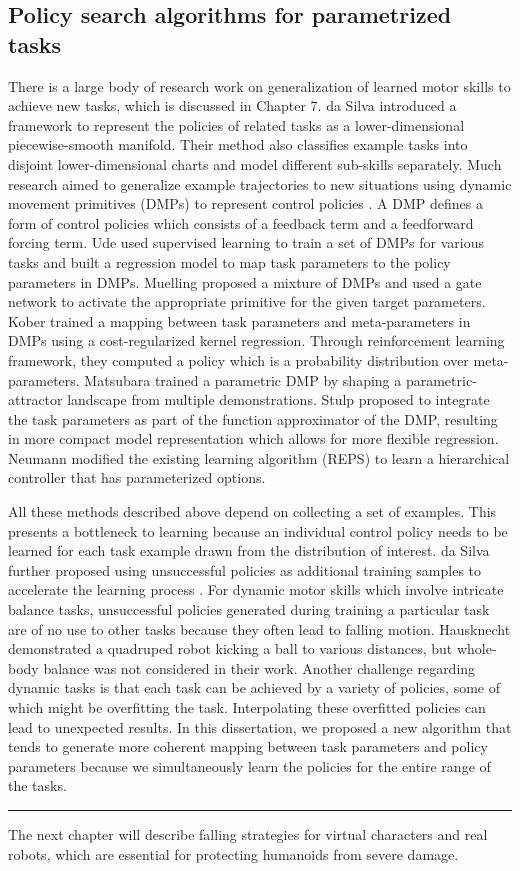 \subsection{Policy search algorithms for parametrized tasks}
There is a large body of research work on generalization of learned
motor skills to achieve new tasks, which is discussed in Chapter 7.
da Silva \etal
\cite{DaSilva:2012:LPS,DaSilva:2014:LPM,DaSilva:2014:ACP} introduced a
framework to represent the policies of related tasks as a
lower-dimensional piecewise-smooth manifold. Their method also
classifies example tasks into disjoint lower-dimensional charts and
model different sub-skills separately. Much research aimed to
generalize example trajectories to new situations using dynamic
movement primitives (DMPs) to represent control policies
\cite{Ijspeert:2002:LAL}. A DMP defines a form of control policies
which consists of a feedback term and a feedforward forcing
term. Ude \etal \cite{Ude:2010:TSG} used supervised learning to train a set of
DMPs for various tasks and built a regression model to map task
parameters to the policy parameters in DMPs. 
Muelling \etal \cite{Muelling:2010:LTT}
proposed a mixture of DMPs and used a gate network to activate the
appropriate primitive for the given target parameters.
Kober \etal \cite{Kober:2010:RLA} trained a mapping between task parameters and
meta-parameters in DMPs using a cost-regularized kernel
regression. Through reinforcement learning framework, they computed a
policy which is a probability distribution over meta-parameters.
Matsubara \etal \cite{Matsubara:2011:LPD} trained a parametric DMP by shaping a
parametric-attractor landscape from multiple demonstrations.
Stulp \etal \cite{Stulp:2013:LCP} proposed to integrate the task parameters as
part of the function approximator of the DMP, resulting in more
compact model representation which allows for more flexible
regression. 
Neumann \etal \cite{Neumann:2013:IMS} modified the existing learning
algorithm (REPS) to learn a hierarchical controller that has
parameterized options.

All these methods described above depend on collecting a set of
examples. This presents a bottleneck to learning because an individual
control policy needs to be learned for each task example drawn from
the distribution of interest. da Silva \etal further proposed using
unsuccessful policies as additional training samples to accelerate the
learning process \cite{DaSilva:2014:LPM}. For dynamic motor skills
which involve intricate balance tasks, unsuccessful policies generated
during training a particular task are of no use to other tasks because
they often lead to falling motion. 
Hausknecht \etal \cite{Hausknecht:2010:LPK}
demonstrated a quadruped robot kicking a ball to various distances,
but whole-body balance was not considered in their work.  Another
challenge regarding dynamic tasks is that each task can be achieved by
a variety of policies, some of which might be overfitting the
task. Interpolating these overfitted policies can lead to unexpected
results. In this dissertation, we proposed a new algorithm that
tends to generate more coherent mapping between
task parameters and policy parameters because we simultaneously learn
the policies for the entire range of the tasks.

\rule{\textwidth}{1pt}
The next chapter will describe falling strategies for
virtual characters and real robots, which are essential for
protecting humanoids from severe damage.
